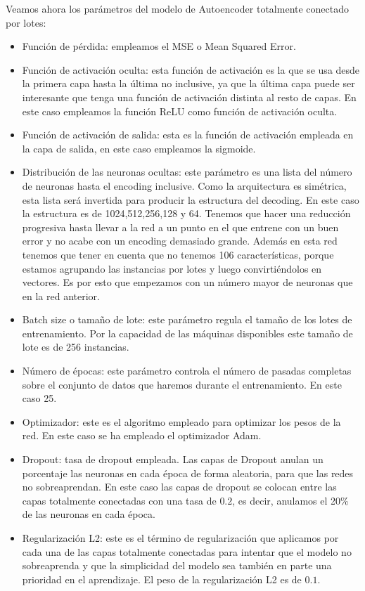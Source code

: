 Veamos ahora los parámetros del modelo de Autoencoder totalmente conectado por lotes:
\begin{itemize}
	\item Función de pérdida: empleamos el MSE o Mean Squared Error.
	\item Función de activación oculta: esta función de activación es la que se usa desde la primera capa hasta la última no inclusive, ya que la última capa puede ser interesante que tenga una función de activación distinta al resto de capas. En este caso empleamos la función ReLU como función de activación oculta.
	\item Función de activación de salida: esta es la función de activación empleada en la capa de salida, en este caso empleamos la sigmoide.
	\item Distribución de las neuronas ocultas: este parámetro es una lista del número de neuronas hasta el encoding inclusive. Como la arquitectura es simétrica, esta lista será invertida para producir la estructura del decoding. En este caso la estructura es de 1024,512,256,128 y 64. Tenemos que hacer una reducción progresiva hasta llevar a la red a un punto en el que entrene con un buen error y no acabe con un encoding demasiado grande. Además en esta red tenemos que tener en cuenta que no tenemos 106 características, porque estamos agrupando las instancias por lotes y luego convirtiéndolos en vectores. Es por esto que empezamos con un número mayor de neuronas que en la red anterior.
	\item Batch size o tamaño de lote: este parámetro regula el tamaño de los lotes de entrenamiento. Por la capacidad de las máquinas disponibles este tamaño de lote es de 256 instancias.
	\item Número de épocas: este parámetro controla el número de pasadas completas sobre el conjunto de datos que haremos durante el entrenamiento. En este caso 25.
	\item Optimizador: este es el algoritmo empleado para optimizar los pesos de la red. En este caso se ha empleado el optimizador Adam.
	\item Dropout: tasa de dropout empleada. Las capas de Dropout anulan un porcentaje las neuronas en cada época de forma aleatoria, para que las redes no sobreaprendan. En este caso las capas de dropout se colocan entre las capas totalmente conectadas con una tasa de $0.2$, es decir, anulamos el 20\% de las neuronas en cada época.
	\item Regularización L2: este es el término de regularización que aplicamos por cada una de las capas totalmente conectadas para intentar que el modelo no sobreaprenda y que la simplicidad del modelo sea también en parte una prioridad en el aprendizaje. El peso de la regularización L2 es de $0.1$.

\end{itemize}
